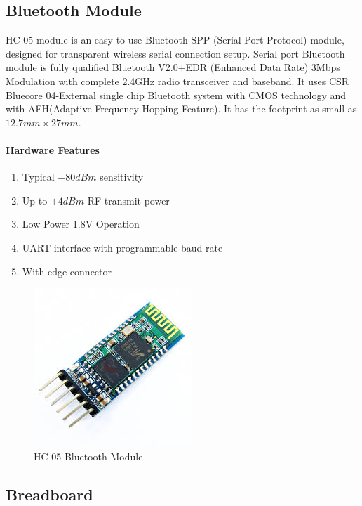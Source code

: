 \documentclass[14pt,a4paper]{extarticle}
\begin{document}
	
		\subsection{Bluetooth Module}
	
	HC-05 module is an easy to use Bluetooth SPP (Serial Port Protocol) module, designed for transparent wireless serial connection setup. Serial port Bluetooth module is fully qualified Bluetooth V2.0+EDR (Enhanced Data Rate) 3Mbps Modulation with complete 2.4GHz radio transceiver and baseband. It uses CSR Bluecore 04-External single chip Bluetooth system with CMOS technology and with AFH(Adaptive Frequency Hopping Feature). It has the footprint as small as  $ {12.7mm \times 27mm}$.
	
	\paragraph{Hardware Features}

	\begin{enumerate}

	\item Typical $-80dBm$ sensitivity
	\item Up to $+4dBm$ RF transmit power
	\item Low Power 1.8V Operation
	\item UART interface with programmable baud rate
	\item With edge connector
	\end{enumerate}
	
	\begin{figure}[H]
		\includegraphics[center]{hc05.jpg}
		\caption{HC-05 Bluetooth Module}
	\end{figure}

	\subsection{Breadboard}
	
\end{document}
